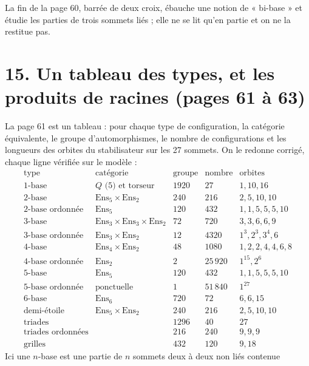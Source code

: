 \documentclass[11pt,a4paper]{article}
\begin{document}
La fin de la page 60, barrée de deux croix, ébauche une notion de
« bi-base » et étudie les parties de trois sommets liés ; elle ne se lit
qu'en partie et on ne la restitue pas.

\section*{15. Un tableau des types, et les produits de racines (pages 61 à 63)}

La page 61 est un tableau : pour chaque type de configuration, la catégorie
équivalente, le groupe d'automorphismes, le nombre de configurations et les
longueurs des orbites du stabilisateur sur les 27 sommets. On le redonne
corrigé, chaque ligne vérifiée sur le modèle :
\[
\begin{array}{llrrl}
\text{type} & \text{catégorie} & \text{groupe} & \text{nombre} &
\text{orbites} \\ \hline
1\text{-base} & Q \text{ (5) et torseur} & 1920 & 27 & 1, 10, 16 \\
2\text{-base} & \mathrm{Ens}_5 \times \mathrm{Ens}_2 & 240 & 216 & 2, 5, 10, 10
\\
2\text{-base ordonnée} & \mathrm{Ens}_5 & 120 & 432 & 1, 1, 5, 5, 5, 10 \\
3\text{-base} & \mathrm{Ens}_3 \times \mathrm{Ens}_3 \times \mathrm{Ens}_2 &
72 & 720 & 3, 3, 6, 6, 9 \\
3\text{-base ordonnée} & \mathrm{Ens}_3 \times \mathrm{Ens}_2 & 12 & 4320 &
1^3, 2^3, 3^4, 6 \\
4\text{-base} & \mathrm{Ens}_4 \times \mathrm{Ens}_2 & 48 & 1080 & 1, 2, 2,
4, 4, 6, 8 \\
4\text{-base ordonnée} & \mathrm{Ens}_2 & 2 & 25\,920 & 1^{15}, 2^6 \\
5\text{-base} & \mathrm{Ens}_5 & 120 & 432 & 1, 1, 5, 5, 5, 10 \\
5\text{-base ordonnée} & \text{ponctuelle} & 1 & 51\,840 & 1^{27} \\
6\text{-base} & \mathrm{Ens}_6 & 720 & 72 & 6, 6, 15 \\
\text{demi-étoile} & \mathrm{Ens}_5 \times \mathrm{Ens}_2 & 240 & 216 & 2, 5,
10, 10 \\
\text{triades} & & 1296 & 40 & 27 \\
\text{triades ordonnées} & & 216 & 240 & 9, 9, 9 \\
\text{grilles} & & 432 & 120 & 9, 18
\end{array}
\]
Ici une $n$-base est une partie de $n$ sommets deux à deux non liés contenue
\end{document}

